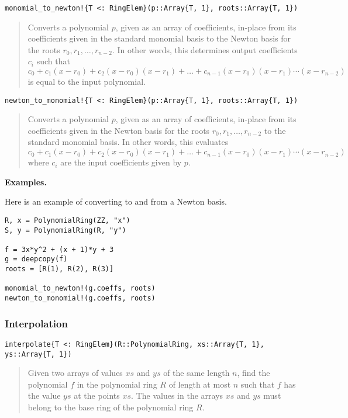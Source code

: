 \documentclass[a4paper,10pt]{article}
\newcommand{\desc}[1]{\vspace{-3mm}\begin{quote}#1\end{quote}}
\begin{document}
\begin{lstlisting}
monomial_to_newton!{T <: RingElem}(p::Array{T, 1}, roots::Array{T, 1})
\end{lstlisting}

\desc{Converts a polynomial $p$, given as an array of coefficients, in-place
from its coefficients given in the standard monomial basis to the Newton basis
for the roots $r_0, r_1, \ldots, r_{n-2}$. In other words, this determines
output coefficients $c_i$ such that
$$c_0 + c_1(x-r_0) + c_2(x-r_0)(x-r_1) + \ldots +
        c_{n-1}(x-r_0)(x-r_1)\cdots(x-r_{n-2})$$
is equal to the input polynomial.}

\begin{lstlisting}
newton_to_monomial!{T <: RingElem}(p::Array{T, 1}, roots::Array{T, 1})
\end{lstlisting}

\desc{Converts a polynomial $p$, given as an array of coefficients, in-place
from its coefficients given in the Newton basis for the roots
$r_0, r_1, \ldots, r_{n-2}$ to the standard monomial basis. In other words,
this evaluates
$$c_0 + c_1(x-r_0) + c_2(x-r_0)(x-r_1) + \ldots +
        c_{n-1}(x-r_0)(x-r_1)\cdots(x-r_{n-2})$$
where $c_i$ are the input coefficients given by $p$.}

\textbf{Examples.}

Here is an example of converting to and from a Newton basis.

\begin{lstlisting}
R, x = PolynomialRing(ZZ, "x")
S, y = PolynomialRing(R, "y")

f = 3x*y^2 + (x + 1)*y + 3
g = deepcopy(f)
roots = [R(1), R(2), R(3)]

monomial_to_newton!(g.coeffs, roots)
newton_to_monomial!(g.coeffs, roots)
\end{lstlisting}

\subsubsection{Interpolation}

\begin{lstlisting}
interpolate{T <: RingElem}(R::PolynomialRing, xs::Array{T, 1}, ys::Array{T, 1})
\end{lstlisting}

\desc{Given two arrays of values $xs$ and $ys$ of the same length $n$, find
the polynomial $f$ in the polynomial ring $R$ of length at most $n$ such that
$f$ has the value $ys$ at the points $xs$. The values in the arrays $xs$ and
$ys$ must belong to the base ring of the polynomial ring $R$.}
\end{document}
